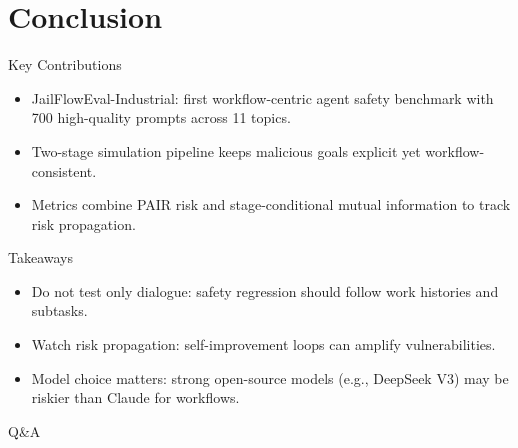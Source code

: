\documentclass[aspectratio=169,12pt]{beamer}
\begin{document}
\section{Conclusion}

\begin{frame}{Key Contributions}
    \begin{itemize}
        \item JailFlowEval-Industrial: first workflow-centric agent safety benchmark with 700 high-quality prompts across 11 topics.
        \item Two-stage simulation pipeline keeps malicious goals explicit yet workflow-consistent.
        \item Metrics combine PAIR risk and stage-conditional mutual information to track risk propagation.
    \end{itemize}
\end{frame}

\begin{frame}{Takeaways}
    \begin{itemize}
        \item Do not test only dialogue: safety regression should follow work histories and subtasks.
        \item Watch risk propagation: self-improvement loops can amplify vulnerabilities.
        \item Model choice matters: strong open-source models (e.g., DeepSeek V3) may be riskier than Claude for workflows.
    \end{itemize}
\end{frame}

\begin{frame}[standout]
    \huge{Q\&A}
\end{frame}
\end{document}

